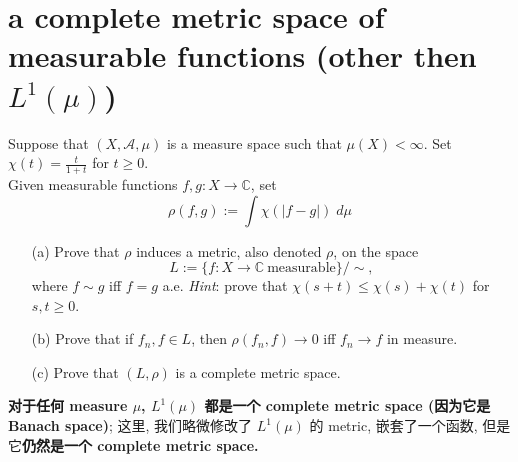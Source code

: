 \documentclass[lang=cn,11pt]{elegantbook}
\begin{document}
\section{a complete metric space of measurable functions (other then $L^1(\mu)$) }
  Suppose that $(X,\mathcal{A},\mu)$ is a measure space such that $\mu(X)<\infty$. Set $\chi(t)=\frac{t}{1+t}$ for $t\ge 0$.\\
  Given measurable functions $f,g\colon X\to\mathbb{C}$, set\[
    \rho(f,g):=\int\chi(|f-g|)\; d\mu
  \]
  \begin{itemize}
  \item[(a)]Prove that $\rho$ induces a metric, also denoted $\rho$, on the space \[
      L:=\{f\colon X\to\mathbb{C}\ \text{measurable}\}/\!\!\sim,
    \]
    where $f\sim g$ iff $f=g$ a.e. \textit{Hint}: prove that $\chi(s+t)\le\chi(s)+\chi(t)$ for $s,t\ge0$.
  \item[(b)]Prove that if $f_n,f\in L$, then $\rho(f_n,f)\to0$ iff $f_n\to f$ in measure.
  \item[(c)] Prove that $(L,\rho)$ is a complete metric space.
  \end{itemize}    
\begin{remark}
\textbf{对于任何 measure $\mu$, $L^1(\mu)$ 都是一个 complete metric space (因为它是 Banach space)}; 这里, 我们略微修改了 $L^1(\mu)$ 的 metric, 嵌套了一个函数, 但是它\textbf{仍然是一个 complete metric space.}
\end{remark}
\end{document}

